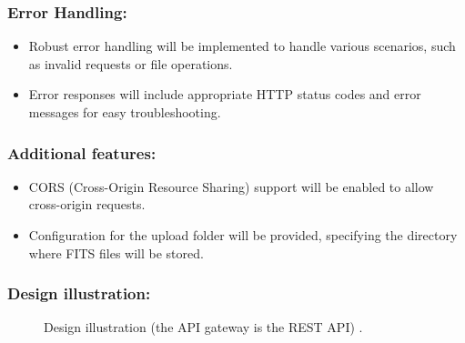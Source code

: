 \documentclass[a4paper,oneside,11pt]{book}
\begin{document}
\subsubsection{Error Handling:}
\begin{itemize}
    \item Robust error handling will be implemented to handle various scenarios, such as invalid requests or file operations.
    \item Error responses will include appropriate HTTP status codes and error messages for easy troubleshooting.
\end{itemize}
\subsubsection{Additional features:}
\begin{itemize}
    \item CORS (Cross-Origin Resource Sharing) support will be enabled to allow cross-origin requests.
    \item Configuration for the upload folder will be provided, specifying the directory where FITS files will be stored.
\end{itemize}
\subsubsection{Design illustration:}
\begin{figure}[h]
    \centering
    \caption{Design illustration (the API gateway is the REST API) \citep{fits_3}.}
\end{figure}
\end{document}
